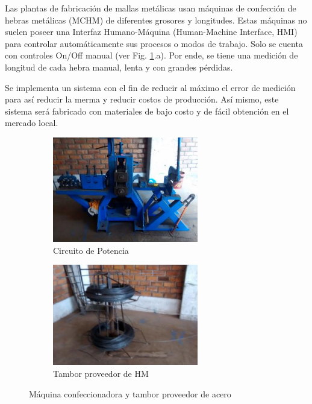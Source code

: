 \documentclass[main_conf.tex]{subfiles}
\begin{document}
Las plantas de fabricación de mallas metálicas usan máquinas de
confección de hebras metálicas (MCHM) de diferentes grosores y
longitudes. Estas máquinas no suelen poseer una Interfaz
Humano-Máquina (Human-Machine Interface, HMI) para controlar
automáticamente sus procesos o modos de trabajo. Solo se 
cuenta con controles On/Off manual (ver Fig.
\ref{maquina_a_automatizar}.a). Por ende, se tiene una medición
de longitud de cada hebra manual, lenta y con grandes pérdidas.

Se implementa un sistema con el fin de reducir al máximo el
error de medición para así reducir la merma y reducir costos de
producción. Así mismo, este sistema será fabricado con materiales
de bajo costo y de fácil obtención en el mercado local.

\begin{figure}[t]
  \centering
  \begin{subfigure}[b]{0.5\textwidth}
    \centering
    \includegraphics[width=2.5in]{../img/maquina/toda.jpg}
    \caption{Circuito de Potencia}
  \end{subfigure}

  \begin{subfigure}[b]{0.5\textwidth}
    \centering
    \includegraphics[width=2.5in]{../img/maquina/tambor.jpg}
    \caption{Tambor proveedor de HM}
  \end{subfigure}

  \caption{Máquina confeccionadora y tambor proveedor de acero}
  \label{maquina_a_automatizar}
\end{figure}
\end{document}

